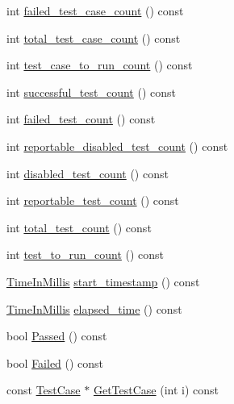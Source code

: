 \begin{DoxyCompactItemize}
\item 
int \hyperlink{classtesting_1_1_unit_test_a1084a93a4b92c6506738e309b0a9eeea}{failed\-\_\-test\-\_\-case\-\_\-count} () const 
\item 
int \hyperlink{classtesting_1_1_unit_test_a6802793a0be9cee17380fdd8c7161fcd}{total\-\_\-test\-\_\-case\-\_\-count} () const 
\item 
int \hyperlink{classtesting_1_1_unit_test_abb7330165eb5be7beac3f7e6ced5fcdd}{test\-\_\-case\-\_\-to\-\_\-run\-\_\-count} () const 
\item 
int \hyperlink{classtesting_1_1_unit_test_a4795d58351f03498d5823a743b0722c5}{successful\-\_\-test\-\_\-count} () const 
\item 
int \hyperlink{classtesting_1_1_unit_test_aeda0f8ca87adf65f634c3d6d9ab98598}{failed\-\_\-test\-\_\-count} () const 
\item 
int \hyperlink{classtesting_1_1_unit_test_aa5eaf98c5d9cc0afe501ac03e6414188}{reportable\-\_\-disabled\-\_\-test\-\_\-count} () const 
\item 
int \hyperlink{classtesting_1_1_unit_test_a4cbd084447b74784d1bb85c1ed4b96d5}{disabled\-\_\-test\-\_\-count} () const 
\item 
int \hyperlink{classtesting_1_1_unit_test_aa32cb4f3cd34564a5c641bd409f8f83b}{reportable\-\_\-test\-\_\-count} () const 
\item 
int \hyperlink{classtesting_1_1_unit_test_a54315b233d354693b9aa1184cf2996de}{total\-\_\-test\-\_\-count} () const 
\item 
int \hyperlink{classtesting_1_1_unit_test_a953a52f89898a04ee4a4e08469407cd3}{test\-\_\-to\-\_\-run\-\_\-count} () const 
\item 
\hyperlink{namespacetesting_a992de1d091ce660f451d1e8b3ce30fd6}{Time\-In\-Millis} \hyperlink{classtesting_1_1_unit_test_aa7d2853c08558b685df818d47f44a10c}{start\-\_\-timestamp} () const 
\item 
\hyperlink{namespacetesting_a992de1d091ce660f451d1e8b3ce30fd6}{Time\-In\-Millis} \hyperlink{classtesting_1_1_unit_test_aeff5643edc3624e49085e2850512a7de}{elapsed\-\_\-time} () const 
\item 
bool \hyperlink{classtesting_1_1_unit_test_a4ef49e958702bf741e7eaa4864e28a48}{Passed} () const 
\item 
bool \hyperlink{classtesting_1_1_unit_test_ad7711156d07d6037d8f497e5c385f78d}{Failed} () const 
\item 
const \hyperlink{classtesting_1_1_test_case}{Test\-Case} $\ast$ \hyperlink{classtesting_1_1_unit_test_a3f324a8067d56044b56cec58d1edf7ac}{Get\-Test\-Case} (int i) const 

\end{DoxyCompactItemize}
